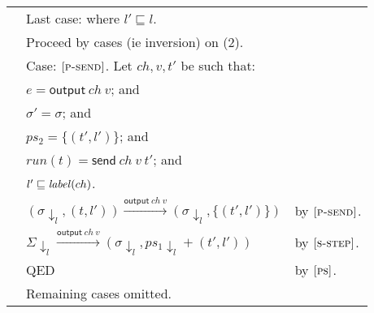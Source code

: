 \documentclass{article}
\newcommand{\rn}[1]{\text{\textsc{[#1]}}}
\newcommand{\tsteparrow}[1]{\overset{#1}{\longrightarrow}}
\newcommand{\tstep}[3]{#2\tsteparrow{#1}#3}
\newcommand{\ssteparrow}[1]{\overset{#1}{\longrightarrow}}
\newcommand{\sstep}[3]{#2\ssteparrow{#1}#3}
\newcommand{\s}[1]{\text{\textit{#1}}}
\newcommand{\process}[2]{(#1,#2)}
\newcommand{\opsend}[3]{\textsf{send}~#1~#2~#3}
\newcommand{\evsend}[2]{\textsf{output}~#1~#2}
\newcommand{\proj}[2]{#1{\downarrow_{#2}}}
\begin{document}
\begin{tabular}{l@{$\qquad$}l@{$\qquad$}l}
        & Last case: where $l'\sqsubseteq l$.
\\
        & Proceed by cases (ie inversion) on (2).
\\
        & Case: $\rn{p-send}$. Let $ch,v,t'$ be such that:
\\
        & \z $e=\evsend{ch}{v}$; and
\\
        & \z $\sigma'=\sigma$; and
\\
        & \z $ps_2=\{\process{t'}{l'}\}$; and
\\
        & \z $run(t)=\opsend{ch}{v}{t'}$; and
\\
        & \z $l'\sqsubseteq\s{label}(ch)$.
\\
        & \z $\tstep{\evsend{ch}{v}}{(\proj{\sigma}{l},\process{t}{l'})}{(\proj{\sigma}{l},\{\process{t'}{l'}\})}$
        & by $\rn{p-send}$.
\\
        & \z $\sstep{\evsend{ch}{v}}{\proj{\Sigma}{l}}{(\proj{\sigma}{l},\proj{ps_1}{l}+\process{t'}{l'})}$
        & by $\rn{s-step}$.
\\
        & \z QED
        & by $\rn{ps}$.
\\
        & Remaining cases omitted.
\end{tabular}
\end{document}
